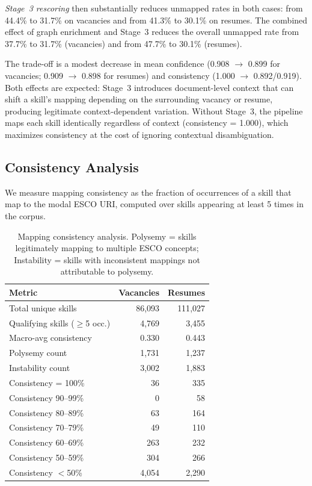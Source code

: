 \documentclass[11pt]{article}
\begin{document}
\emph{Stage~3 rescoring} then substantially reduces unmapped rates in both cases: from 44.4\% to 31.7\% on vacancies and from 41.3\% to 30.1\% on resumes. The combined effect of graph enrichment and Stage~3 reduces the overall unmapped rate from 37.7\% to 31.7\% (vacancies) and from 47.7\% to 30.1\% (resumes).

The trade-off is a modest decrease in mean confidence (0.908 $\to$ 0.899 for vacancies; 0.909 $\to$ 0.898 for resumes) and consistency (1.000 $\to$ 0.892/0.919). Both effects are expected: Stage~3 introduces document-level context that can shift a skill's mapping depending on the surrounding vacancy or resume, producing legitimate context-dependent variation. Without Stage~3, the pipeline maps each skill identically regardless of context (consistency = 1.000), which maximizes consistency at the cost of ignoring contextual disambiguation.

\subsection{Consistency Analysis}
\label{sec:eval-consistency}

We measure mapping consistency as the fraction of occurrences of a skill that map to the modal ESCO URI, computed over skills appearing at least 5 times in the corpus.

\begin{table}[h]
  \centering
  \small
  \begin{tabular}{@{}lrr@{}}
    \toprule
    \textbf{Metric} & \textbf{Vacancies} & \textbf{Resumes} \\
    \midrule
    Total unique skills & 86{,}093 & 111{,}027 \\
    Qualifying skills ($\geq$5 occ.) & 4{,}769 & 3{,}455 \\
    Macro-avg consistency & 0.330 & 0.443 \\
    \midrule
    Polysemy count & 1{,}731 & 1{,}237 \\
    Instability count & 3{,}002 & 1{,}883 \\
    \midrule
    Consistency = 100\% & 36 & 335 \\
    Consistency 90--99\% & 0 & 58 \\
    Consistency 80--89\% & 63 & 164 \\
    Consistency 70--79\% & 49 & 110 \\
    Consistency 60--69\% & 263 & 232 \\
    Consistency 50--59\% & 304 & 266 \\
    Consistency $<$50\% & 4{,}054 & 2{,}290 \\
    \bottomrule
  \end{tabular}
  \caption{Mapping consistency analysis. Polysemy = skills legitimately mapping to multiple ESCO concepts; Instability = skills with inconsistent mappings not attributable to polysemy.}
  \label{tab:consistency}
\end{table}
\end{document}
